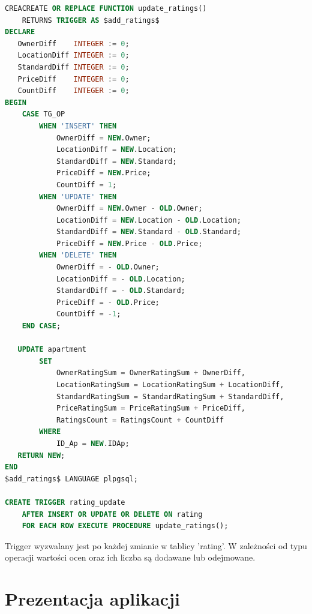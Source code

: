 \documentclass[polish, 11pt]{article}
\begin{document}
    \begin{lstlisting}[language=SQL]
CREACREATE OR REPLACE FUNCTION update_ratings()
	RETURNS TRIGGER AS $add_ratings$
DECLARE
   OwnerDiff	INTEGER := 0;
   LocationDiff	INTEGER := 0;
   StandardDiff	INTEGER := 0;
   PriceDiff	INTEGER := 0;
   CountDiff	INTEGER := 0;
BEGIN
	CASE TG_OP
		WHEN 'INSERT' THEN
			OwnerDiff = NEW.Owner;
			LocationDiff = NEW.Location;
			StandardDiff = NEW.Standard;
			PriceDiff = NEW.Price;
			CountDiff = 1;
		WHEN 'UPDATE' THEN
			OwnerDiff = NEW.Owner - OLD.Owner;
			LocationDiff = NEW.Location - OLD.Location;
			StandardDiff = NEW.Standard - OLD.Standard;
			PriceDiff = NEW.Price - OLD.Price;
		WHEN 'DELETE' THEN
			OwnerDiff = - OLD.Owner;
			LocationDiff = - OLD.Location;
			StandardDiff = - OLD.Standard;
			PriceDiff = - OLD.Price;
			CountDiff = -1;
	END CASE;
	
   UPDATE apartment
		SET
			OwnerRatingSum = OwnerRatingSum + OwnerDiff,
			LocationRatingSum = LocationRatingSum + LocationDiff,
			StandardRatingSum = StandardRatingSum + StandardDiff,
			PriceRatingSum = PriceRatingSum + PriceDiff,
			RatingsCount = RatingsCount + CountDiff
		WHERE
			ID_Ap = NEW.IDAp;
   RETURN NEW;
END
$add_ratings$ LANGUAGE plpgsql;
			
CREATE TRIGGER rating_update
    AFTER INSERT OR UPDATE OR DELETE ON rating
    FOR EACH ROW EXECUTE PROCEDURE update_ratings();
    \end{lstlisting}
    Trigger wyzwalany jest po każdej zmianie w tablicy 'rating'.
    W zależności od typu operacji wartości ocen oraz ich liczba są dodawane lub odejmowane.
    
\section{Prezentacja aplikacji}
\end{document}

